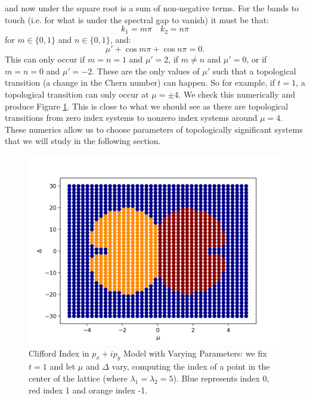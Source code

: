 \documentclass[a4paper]{article}
\begin{document}
and now under the square root is a sum of non-negative terms. For the bands to touch (i.e. for what is under the spectral gap to vanish) it must be that:
\begin{equation}
	k_1 = m \pi \quad k_2 = n \pi
\end{equation}
for $m \in \{0,1\}$ and $n \in \{0,1\}$, and:
\begin{equation}
	\mu' + \cos m \pi + \cos n \pi = 0.
\end{equation}
This can only occur if $m = n = 1$ and $\mu' = 2$, if $m \neq n$ and $\mu' = 0$, or if $m = n = 0$ and $\mu' = - 2$.
These are the only values of $\mu'$ such that a topological transition (a change in the Chern number) can happen.
So for example, if $t = 1$, a topological transition can only occur at $\mu = \pm4$.
We check this numerically and produce Figure \ref{fig:pxipy_params}.
This is close to what we should see as there are topological transitions from zero index systems to nonzero index systems around $\mu = 4$.
These numerics allow us to choose parameters of topologically significant systems that we will study in the following section.

\begin{figure}
\centering
\includegraphics[width=.9\textwidth]{figures/pxipy_index_by_param.png}
\caption{Clifford Index in $p_x + ip_y$ Model with Varying Parameters: we fix $t = 1$ and let $\mu$ and $\Delta$ vary, computing the index of a point in the center of the lattice (where $\lambda_1 = \lambda_2 = 5$).
Blue represents index 0, red index 1 and orange index -1.
}
\label{fig:pxipy_params}%
\end{figure}
\end{document}
